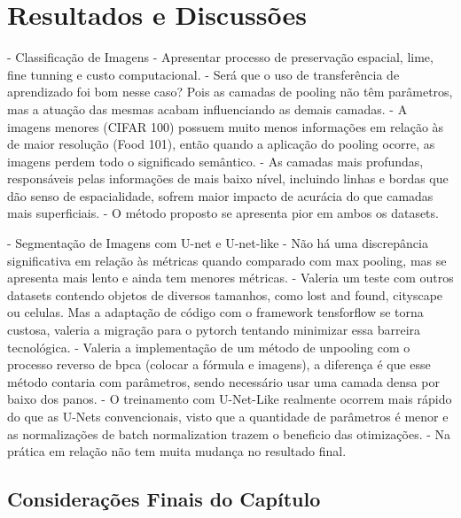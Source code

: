 \newpage
\clearpage

\section{Resultados e Discussões}
\label{results}

- Classificação de Imagens
        - Apresentar processo de preservação espacial, lime, fine tunning e custo computacional.
        - Será que o uso de transferência de aprendizado foi bom nesse caso? Pois as camadas de pooling não têm parâmetros, mas a atuação das mesmas acabam influenciando as demais camadas.
        - A imagens menores (CIFAR 100) possuem muito menos informações em relação às de maior resolução (Food 101), então quando a aplicação do pooling ocorre, as imagens perdem todo o significado semântico.
        - As camadas mais profundas, responsáveis pelas informações de mais baixo nível, incluindo linhas e bordas que dão senso de espacialidade, sofrem maior impacto de acurácia do que camadas mais superficiais.
        - O método proposto se apresenta pior em ambos os datasets.

- Segmentação de Imagens com U-net e U-net-like
        - Não há uma discrepância significativa em relação às métricas quando comparado com max pooling, mas se apresenta mais lento e ainda tem menores métricas.
        - Valeria um teste com outros datasets contendo objetos de diversos tamanhos, como lost and found, cityscape ou celulas. Mas a adaptação de código com o framework tensforflow se torna custosa, valeria a migração para o pytorch tentando minimizar essa barreira tecnológica.
        - Valeria a implementação de um método de unpooling com o processo reverso de bpca (colocar a fórmula e imagens), a diferença é que esse método contaria com parâmetros, sendo necessário usar uma camada densa por baixo dos panos.
        - O treinamento com U-Net-Like realmente ocorrem mais rápido do que as U-Nets convencionais, visto que a quantidade de parâmetros é menor e as normalizações de batch normalization trazem o beneficio das otimizações.
        - Na prática em relação não tem muita mudança no resultado final.

\subsection{Considerações Finais do Capítulo}
\label{result:final}
